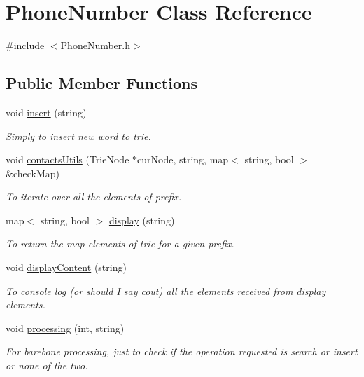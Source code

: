 \hypertarget{class_phone_number}{}\section{Phone\+Number Class Reference}
\label{class_phone_number}


{\ttfamily \#include $<$Phone\+Number.\+h$>$}

\subsection*{Public Member Functions}
\begin{DoxyCompactItemize}
\item 
void \hyperlink{class_phone_number_a2a9b999ad972df12db343245c95bab1b}{insert} (string)
\begin{DoxyCompactList}\small\item\em Simply to insert new word to trie. \end{DoxyCompactList}\item 
void \hyperlink{class_phone_number_a8ccd9871c68caa6d5b5b8f915d7b2567}{contacts\+Utils} (Trie\+Node $\ast$cur\+Node, string, map$<$ string, bool $>$ \&check\+Map)
\begin{DoxyCompactList}\small\item\em To iterate over all the elements of prefix. \end{DoxyCompactList}\item 
map$<$ string, bool $>$ \hyperlink{class_phone_number_a0aefa75c9d4542be0ca256c798706732}{display} (string)
\begin{DoxyCompactList}\small\item\em To return the map elements of trie for a given prefix. \end{DoxyCompactList}\item 
void \hyperlink{class_phone_number_a4e8abfb7ecb3e046a3bbbb4e5bdd3f64}{display\+Content} (string)
\begin{DoxyCompactList}\small\item\em To console log (or should I say cout) all the elements received from display elements. \end{DoxyCompactList}\item 
void \hyperlink{class_phone_number_a61de2e13f110953bad6af57895c860d2}{processing} (int, string)
\begin{DoxyCompactList}\small\item\em For barebone processing, just to check if the operation requested is search or insert or none of the two. \end{DoxyCompactList}\end{DoxyCompactItemize}


